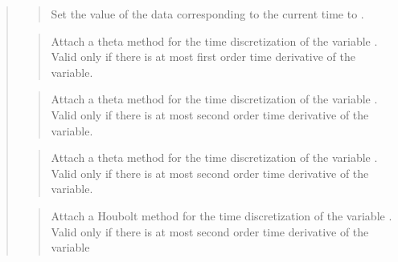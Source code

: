 \documentclass[a4paper,11pt,english]{sphinxmanual}
\begin{document}
\begin{quote}
\sphinxAtStartPar
{}
\begin{quote}

\sphinxAtStartPar
Set the value of the data  corresponding to the current time to .
\end{quote}

\sphinxAtStartPar
{}
\begin{quote}

\sphinxAtStartPar
Attach a theta method for the time discretization of the variable
. Valid only if there is at most first order time derivative
of the variable.
\end{quote}

\sphinxAtStartPar
{}
\begin{quote}

\sphinxAtStartPar
Attach a theta method for the time discretization of the variable
. Valid only if there is at most second order time derivative
of the variable.
\end{quote}

\sphinxAtStartPar
{}
\begin{quote}

\sphinxAtStartPar
Attach a theta method for the time discretization of the variable
. Valid only if there is at most second order time derivative
of the variable.
\end{quote}

\sphinxAtStartPar
{}
\begin{quote}

\sphinxAtStartPar
Attach a Houbolt method for the time discretization of the variable
. Valid only if there is at most second order time derivative
of the variable
\end{quote}

\sphinxAtStartPar
{}
\begin{quote}


\end{quote}
\end{quote}
\end{document}
